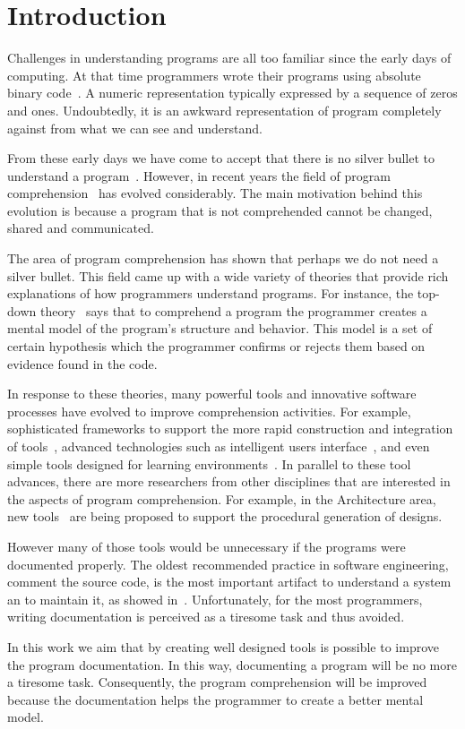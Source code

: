 
% 
% 

\section{Introduction}

Challenges in understanding programs are all too familiar since the early days of computing. At that time programmers wrote their programs using absolute binary code~\cite{hamming2003art}. A numeric representation typically expressed by a sequence of zeros and ones. Undoubtedly, it is an awkward representation of program completely against from what we can see and understand.

From these early days we have come to accept that there is no silver bullet to understand a program~\cite{bullet1987essence}. However, in recent years the field of program comprehension~\cite{rugaber1995program} has evolved considerably. The main motivation behind this evolution is because a program that is not comprehended cannot be changed, shared and communicated. 

The area of program comprehension has shown that perhaps we do not need a silver bullet. This field came up with a wide variety of theories that provide rich explanations of how programmers understand programs. For instance, the top-down theory~\cite{brooks1977towards} says that to comprehend a program the programmer creates a mental model of the program's structure and behavior. This model is a set of certain hypothesis which the programmer confirms or rejects them based on evidence found in the code.

In response to these theories, many powerful tools and innovative software processes have evolved to improve comprehension activities. For example, sophisticated frameworks to support the more rapid construction and integration of tools~\cite{DesRivieres2004}, advanced technologies such as intelligent users interface~\cite{carlson2005eclipse,boudreau2002netbeans,intellij2001intellij,guckenheimer2006software}, and even simple tools designed for learning environments~\cite{papert1980mindstorms,Kay1993,Reas2006,findler2002drscheme,GuoSIGCSE2013,mcdirmid2013usable}. In parallel to these tool advances, there are more researchers from other disciplines that are interested in the aspects of program comprehension. For example, in the Architecture area, new tools~\cite{aish2012designscript,lopes2011portable} are being proposed to support the procedural generation of designs.

However many of those tools would be unnecessary if the programs were documented properly. The oldest recommended practice in software engineering, comment the source code, is the most important artifact to understand a system an to maintain it, as showed in~\cite{de2005study}. Unfortunately, for the most programmers, writing documentation is perceived as a tiresome task and thus avoided.

In this work we aim that by creating well designed tools is possible to improve the program documentation. In this way, documenting a program will be no more a tiresome task. Consequently, the program comprehension will be improved because the documentation helps the programmer to create a better mental model.